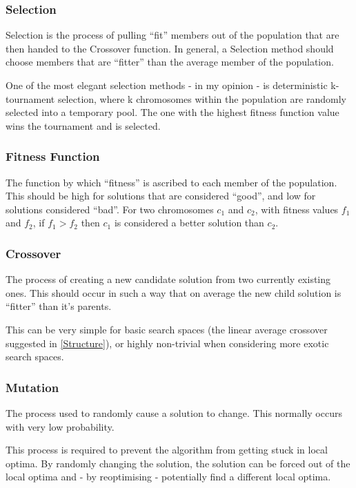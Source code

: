 \subsubsection{Selection} \label{Selection}
Selection is the process of pulling ``fit'' members out of the population that are then handed to the Crossover function. In general, a Selection method should choose members that are ``fitter'' than the average member of the population. \newline

One of the most elegant selection methods - in my opinion - is deterministic k-tournament selection, where k chromosomes within the population are randomly selected into a temporary pool. The one with the highest fitness function value wins the tournament and is selected.

\subsubsection{Fitness Function} \label{Fitness}
The function by which ``fitness'' is ascribed to each member of the population. This should be high for solutions that are considered ``good'', and low for solutions considered ``bad''. For two chromosomes $c_1$ and $c_2$, with fitness values $f_1$ and $f_2$, if $f_1 > f_2$ then $c_1$ is considered a better solution than $c_2$. 

\subsubsection{Crossover} \label{Crossover}
The process of creating a new candidate solution from two currently existing ones. This should occur in such a way that on average the new child solution is ``fitter'' than it's parents. \newline

This can be very simple for basic search spaces (the linear average crossover suggested in \ref{Structure}), or highly non-trivial when considering more exotic search spaces.

\subsubsection{Mutation} \label{Mutation}
The process used to randomly cause a solution to change. This normally occurs with very low probability. \newline

This process is required to prevent the algorithm from getting stuck in local optima. By randomly changing the solution, the solution can be forced out of the local optima and - by reoptimising - potentially find a different local optima.


